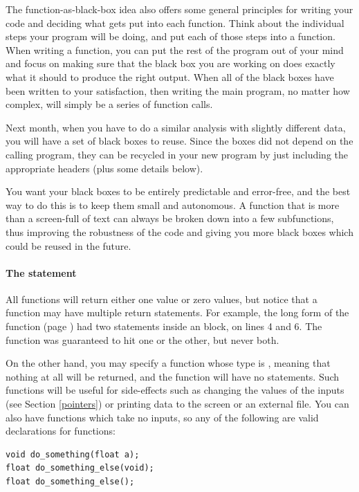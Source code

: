 \documentclass[12pt]{article}
\makeatletter
\def\cind#1{\index{#1@\ci{#1}}\ci{#1}}
\makeatother
\begin{document}
The function-as-black-box idea also offers some general principles for
writing your code and deciding what gets put into each function. Think
about the individual steps your program will be doing, and put each
of those steps into a function. When writing a function, you
can put the rest of the program out of your mind and focus on making
sure that the black box you are working on does exactly what it should
to produce the right output. When all of the black boxes have been written to
your satisfaction, then writing the main program, no matter how complex,
will simply be a series of function calls.

Next month, when you have to do a similar analysis with slightly different
data, you will have a set of black boxes to reuse. Since the boxes did not
depend on the calling program, they can be recycled in your new program
by just including the appropriate headers (plus some details below).

You want your black boxes to be entirely predictable and error-free,
and the best way to do this is to keep them small and autonomous. A
function that is more than a screen-full of text can always be broken
down into a few subfunctions, thus improving the robustness of the code
and giving you more black boxes which could be reused in the future.

\paragraph{\treesymbol{} The  statement} 
All functions will return
either one value or zero values, but notice that a function may have
multiple return statements. For example, the long form of the
 function (page \pageref{isevenfn}) had two  statements inside
an  block, on lines 4 and 6. The function was guaranteed
to hit one or the other, but never both.

On the other hand,  you may specify a function whose type is \cind{void},
meaning that nothing at all will be returned, and the function will
have no  statements. Such functions will be useful for
side-effects such as changing the values of the inputs (see Section
\ref{pointers}) or printing data to the screen or an external file. You
can also have functions which take no inputs, so any of the following
are valid declarations for functions:

\begin{lstlisting}
void do_something(float a);
float do_something_else(void);
float do_something_else();
\end{lstlisting}
\end{document}
